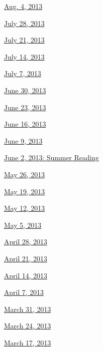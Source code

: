 \href{http://www.nytimes.com/indexes/2013/08/04/books/review/index.html}{Aug.
4, 2013}

\href{http://www.nytimes.com/indexes/2013/07/28/books/review/index.html}{July
28, 2013}

\href{http://www.nytimes.com/indexes/2013/07/21/books/review/index.html}{July
21, 2013}

\href{http://www.nytimes.com/indexes/2013/07/14/books/review/index.html}{July
14, 2013}

\href{http://www.nytimes.com/indexes/2013/07/07/books/review/index.html}{July
7, 2013}

\href{http://www.nytimes.com/indexes/2013/06/30/books/review/index.html}{June
30, 2013}

\href{http://www.nytimes.com/indexes/2013/06/23/books/review/index.html}{June
23, 2013}

\href{http://www.nytimes.com/indexes/2013/06/16/books/review/index.html}{June
16, 2013}

\href{http://www.nytimes.com/indexes/2013/06/09/books/review/index.html}{June
9, 2013}

\href{http://www.nytimes.com/indexes/2013/06/02/books/review/index.html}{June
2, 2013: Summer Reading}

\href{http://www.nytimes.com/indexes/2013/05/26/books/review/index.html}{May
26, 2013}

\href{http://www.nytimes.com/indexes/2013/05/19/books/review/index.html}{May
19, 2013}

\href{http://www.nytimes.com/indexes/2013/05/12/books/review/index.html}{May
12, 2013}

\href{http://www.nytimes.com/indexes/2013/05/05/books/review/index.html}{May
5, 2013}

\href{http://www.nytimes.com/indexes/2013/04/28/books/review/index.html}{April
28, 2013}

\href{http://www.nytimes.com/indexes/2013/04/21/books/review/index.html}{April
21, 2013}

\href{http://www.nytimes.com/indexes/2013/04/14/books/review/index.html}{April
14, 2013}

\href{http://www.nytimes.com/indexes/2013/04/07/books/review/index.html}{April
7, 2013}

\href{http://www.nytimes.com/indexes/2013/03/31/books/review/index.html}{March
31, 2013}

\href{http://www.nytimes.com/indexes/2013/03/24/books/review/index.html}{March
24, 2013}

\href{http://www.nytimes.com/indexes/2013/03/17/books/review/index.html}{March
17, 2013}

